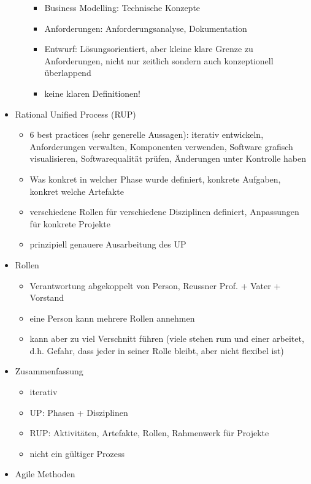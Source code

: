 \documentclass[paper=a4, fontsize=11pt]{scrartcl} %
\numberwithin{equation}{section} %
\numberwithin{figure}{section} %
\numberwithin{table}{section} %
\begin{document}
\begin{itemize}
\begin{itemize}
    \begin{itemize}
      \item Business Modelling: Technische Konzepte
      \item Anforderungen: Anforderungsanalyse, Dokumentation
      \item Entwurf: Lösungsorientiert, aber kleine klare Grenze zu Anforderungen, nicht nur zeitlich sondern auch konzeptionell überlappend
      \item keine klaren Definitionen!
    \end{itemize}
  \end{itemize}
  \item Rational Unified Process (RUP)
  \begin{itemize}
    \item 6 best practices (sehr generelle Aussagen): iterativ entwickeln, Anforderungen verwalten, Komponenten verwenden, Software grafisch visualisieren, Softwarequalität prüfen, Änderungen unter Kontrolle haben
    \item Was konkret in welcher Phase wurde definiert, konkrete Aufgaben, konkret welche Artefakte
    \item verschiedene Rollen für verschiedene Disziplinen definiert, Anpassungen für konkrete Projekte
    \item prinzipiell genauere Ausarbeitung des UP
  \end{itemize}
  \item Rollen
  \begin{itemize}
    \item Verantwortung abgekoppelt von Person, Reussner Prof. + Vater + Vorstand
    \item eine Person kann mehrere Rollen annehmen
    \item kann aber zu viel Verschnitt führen (viele stehen rum und einer arbeitet, d.h. Gefahr, dass jeder in seiner Rolle bleibt, aber nicht flexibel ist)
  \end{itemize}
  \item Zusammenfassung
  \begin{itemize}
    \item iterativ
    \item UP: Phasen + Disziplinen
    \item RUP: Aktivitäten, Artefakte, Rollen, Rahmenwerk für Projekte
    \item nicht ein gültiger Prozess
  \end{itemize}
  \item Agile Methoden
  \begin{itemize}

\end{itemize}
\end{itemize}
\end{document}
